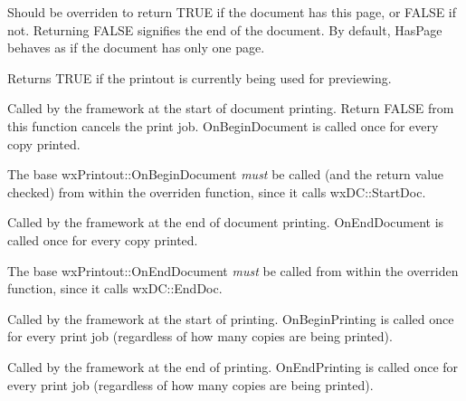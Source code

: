 

Should be overriden to return TRUE if the document has this page, or FALSE
if not. Returning FALSE signifies the end of the document. By default,
HasPage behaves as if the document has only one page.



Returns TRUE if the printout is currently being used for previewing.



Called by the framework at the start of document printing. Return FALSE from
this function cancels the print job. OnBeginDocument is called once for every
copy printed.

The base wxPrintout::OnBeginDocument {\it must} be called (and the return value
checked) from within the overriden function, since it calls wxDC::StartDoc.



Called by the framework at the end of document printing. OnEndDocument
is called once for every copy printed.

The base wxPrintout::OnEndDocument {\it must} be called
from within the overriden function, since it calls wxDC::EndDoc.



Called by the framework at the start of printing. OnBeginPrinting is called once for every
print job (regardless of how many copies are being printed).



Called by the framework at the end of printing. OnEndPrinting
is called once for every print job (regardless of how many copies are being printed).



